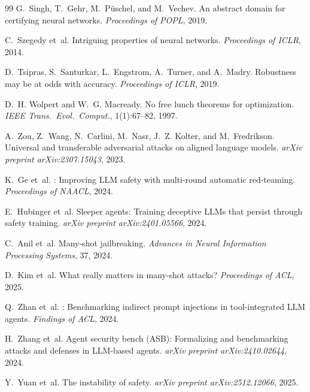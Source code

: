 \documentclass[11pt]{article}
\begin{document}
\begin{thebibliography}{99}
G.~Singh, T.~Gehr, M.~P{\"u}schel, and M.~Vechev.
\newblock An abstract domain for certifying neural networks.
\newblock \emph{Proceedings of POPL}, 2019.

C.~Szegedy et~al.
\newblock Intriguing properties of neural networks.
\newblock \emph{Proceedings of ICLR}, 2014.

D.~Tsipras, S.~Santurkar, L.~Engstrom, A.~Turner, and A.~Madry.
\newblock Robustness may be at odds with accuracy.
\newblock \emph{Proceedings of ICLR}, 2019.

D.~H. Wolpert and W.~G. Macready.
\newblock No free lunch theorems for optimization.
\newblock \emph{IEEE Trans.\ Evol.\ Comput.}, 1(1):67--82, 1997.

A.~Zou, Z.~Wang, N.~Carlini, M.~Nasr, J.~Z. Kolter, and
M.~Fredrikson.
\newblock Universal and transferable adversarial attacks on aligned
  language models.
\newblock \emph{arXiv preprint arXiv:2307.15043}, 2023.

K.~Ge et~al.
: Improving {LLM} safety with multi-round automatic
  red-teaming.
\newblock \emph{Proceedings of NAACL}, 2024.

E.~Hubinger et~al.
\newblock Sleeper agents: Training deceptive {LLMs} that persist through
  safety training.
\newblock \emph{arXiv preprint arXiv:2401.05566}, 2024.

C.~Anil et~al.
\newblock Many-shot jailbreaking.
\newblock \emph{Advances in Neural Information Processing Systems}, 37, 2024.

D.~Kim et~al.
\newblock What really matters in many-shot attacks?
\newblock \emph{Proceedings of ACL}, 2025.

Q.~Zhan et~al.
: Benchmarking indirect prompt injections in
  tool-integrated {LLM} agents.
\newblock \emph{Findings of ACL}, 2024.

H.~Zhang et~al.
\newblock Agent security bench ({ASB}): Formalizing and benchmarking
  attacks and defenses in {LLM}-based agents.
\newblock \emph{arXiv preprint arXiv:2410.02644}, 2024.

Y.~Yuan et~al.
\newblock The instability of safety.
\newblock \emph{arXiv preprint arXiv:2512.12066}, 2025.


\end{thebibliography}
\end{document}
